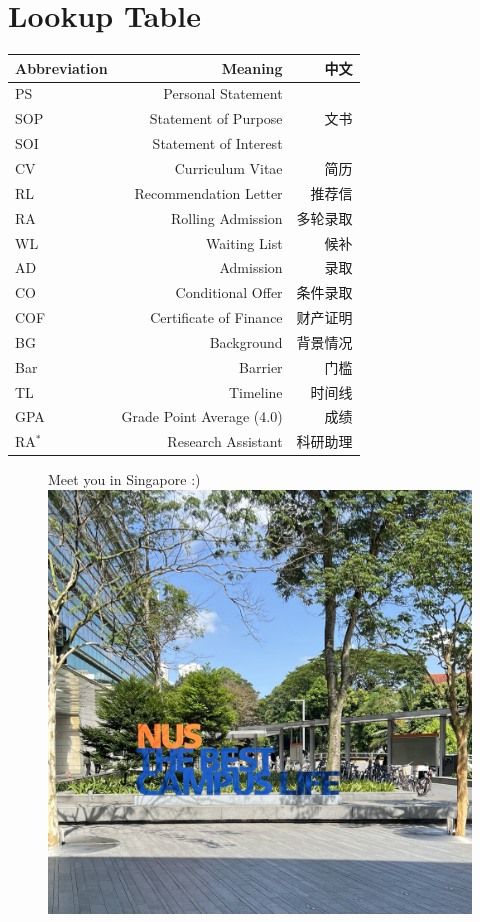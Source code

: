 \documentclass[UTF8]{beamer}
\begin{document}
\section{Lookup Table}
\begin{frame}

  \begin{table}[h]
    \centering
    \small
    \begin{tabular}{l|r|r}\toprule

      Abbreviation & Meaning & 中文 \\

      \midrule
      PS & Personal Statement & \\
      SOP & Statement of Purpose & 文书 \\
      SOI & Statement of Interest  & \\
      CV & Curriculum Vitae  & 简历 \\
      RL & Recommendation Letter & 推荐信 \\

      \midrule
      RA & Rolling Admission & 多轮录取\\ 
      WL & Waiting List & 候补\\ 
      AD & Admission & 录取\\ 
      CO & Conditional Offer & 条件录取 \\ 
      COF & Certificate of Finance & 财产证明 \\ 

      \midrule
      BG & Background & 背景情况 \\ 
      Bar & Barrier & 门槛 \\ 
      TL & Timeline  & 时间线\\ 
      GPA & Grade Point Average (4.0) & 成绩\\ 
      RA$^*$ & Research Assistant & 科研助理 \\ 
      \bottomrule
    \end{tabular}
  \end{table}

\end{frame}

\begin{frame}
  \begin{figure}[h]
    \centering
    {Meet you in Singapore :)}\hfill
    \includegraphics[width=.6\linewidth]{pic/nus.jpeg}
  \end{figure}
\end{frame}
\end{document}
